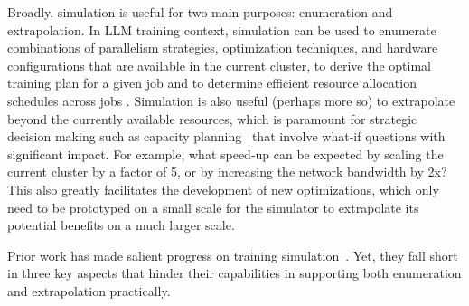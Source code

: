 Broadly, simulation is useful for two main purposes: enumeration and extrapolation.
In LLM training context, simulation can be used to enumerate combinations of parallelism strategies, optimization techniques, and hardware configurations that are available in the current cluster, to derive the optimal training plan for a given job and to determine efficient resource allocation schedules across jobs \cite{SimAI2025NSDI,duan2024proteus}.
Simulation is also useful (perhaps more so) to extrapolate beyond the currently available resources, which is paramount for strategic decision making such as capacity planning~\cite{jiang2024megascale,shoeybi2019megatron} that involve what-if questions with significant impact.
For example, what speed-up can be expected by scaling the current cluster by a factor of 5, or by increasing the network bandwidth by 2x?
This also greatly facilitates the development of new optimizations, which only need to be prototyped on a small scale for the simulator to extrapolate its potential benefits on a much larger scale.


Prior work has made salient progress on training simulation~\cite{jia2019beyond,zhu2020daydream,hu2022dpro,lu2023distsim,isaev2023calculon,won2023astra,liang2025lumos,SimAI2025NSDI,duan2024proteus}. 
Yet, they fall short in three key aspects that hinder their capabilities in supporting both enumeration and extrapolation practically.

